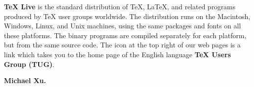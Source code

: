 \documentclass[11pt]{article}
\begin{document}
\textbf{TeX Live} is the standard distribution of TeX, LaTeX, and related programs produced by TeX user groups worldwide. The distribution runs on the Macintosh, Windows, Linux, and Unix machines, using the same packages and fonts on all these platforms. The binary programs are compiled separately for each platform, but from the same source code. The icon at the top right of our web pages is a link which takes you to the home page of the English language \textbf{TeX Users Group (TUG)}.

\textbf{Michael Xu.}

\end{document}
